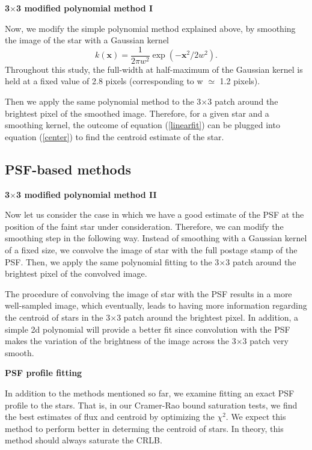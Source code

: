 \documentclass[12pt, preprint]{aastex}
\newcommand{\beq}{\begin{equation}}
\newcommand{\eeq}{\end{equation}}
\begin{document}
\item {\bf 3$\times$3 modified polynomial method I}\quad

Now, we modify the simple polynomial method explained above,
by smoothing the image of the star with a Gaussian kernel
\beq
k(\mathbf{x}) = \frac{1}{2\pi w^2}\exp(-\mathbf{x}^{2}/2w^{2}).
\eeq
Throughout this study, the full-width at half-maximum of the Gaussian kernel is held at
a fixed value of 2.8 pixels (corresponding to w $\simeq$ 1.2 pixels).

Then we apply the same polynomial method to the 3$\times$3 patch around the brightest
pixel of the smoothed image. Therefore, for a given star and a smoothing kernel,
the outcome of equation (\ref{linearfit}) can be
plugged into equation (\ref{center}) to find the centroid estimate
of the star. 

\subsection{PSF-based methods}

\item {\bf 3$\times$3 modified polynomial method II}\quad

Now let us consider the case in which we have a good estimate of the PSF at
the position of the faint star under consideration. Therefore, we 
can modify the smoothing step in the following way. Instead of smoothing
with a Gaussian kernel of a fixed size, we convolve the image of star
with the full postage stamp of the PSF. Then, we apply the same polynomial
fitting to the 3$\times$3 patch around the brightest pixel of the convolved image.

The procedure of convolving the image of star with the PSF results in a
more well-sampled image, which eventually, leads to having more
information regarding the centroid of stars in the 3$\times$3 patch around the
brightest pixel. In addition, a simple 2d polynomial will provide a better fit 
since convolution with the PSF makes the variation of the brightness of the image
 across the 3$\times$3 patch very smooth.

\item {\bf PSF profile fitting}\quad

In addition to the methods mentioned so far, we examine fitting an exact
 PSF profile to the stars. That is, in our Cramer-Rao bound saturation tests, we find the best
 estimates of flux and centroid by optimizing the $\chi^{2}$.
 We expect this method to perform better in determing the centroid
 of stars. In theory, this method should always saturate the CRLB. 
 
\end{document}
